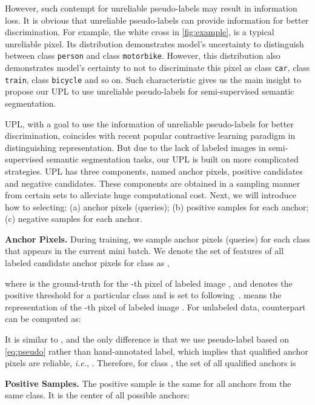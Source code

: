 \documentclass[10pt, twocolumn, letterpaper]{article}
\begin{document}
However, such contempt for unreliable pseudo-labels may result in information loss. 
It is obvious that unreliable pseudo-labels can provide information for better discrimination.
For example, the white cross in \cref{fig:example}, is a typical unreliable pixel. 
Its distribution demonstrates model's uncertainty to distinguish between class \texttt{person} and class \texttt{motorbike}.
However, this distribution also demonstrates model's certainty to not to discriminate this pixel as class \texttt{car}, class \texttt{train}, class \texttt{bicycle} and so on.
Such characteristic gives us the main insight to propose our UPL to use unreliable pseudo-labels for semi-supervised semantic segmentation.



UPL, with a goal to use the information of unreliable pseudo-labels for better discrimination, coincides with recent popular contrastive learning paradigm in distinguishing representation.
But due to the lack of labeled images in semi-supervised semantic segmentation tasks, our UPL is built on more complicated strategies.
UPL has three components, named anchor pixels, positive candidates and negative candidates. 
These components are obtained in a sampling manner from certain sets to alleviate huge computational cost.
Next, we will introduce how to selecting: (a) anchor pixels (queries); (b) positive samples for each anchor; (c) negative samples for each anchor. 



\noindent\textbf{Anchor Pixels.}
During training, we sample anchor pixels (queries) for each class that appears in the current mini batch.
We denote the set of features of all labeled candidate anchor pixels for class  as , 

where  is the ground-truth for the -th pixel of labeled image , and  denotes the positive threshold for a particular class and is set to  following~\cite{reco}. 
 means the representation of the -th pixel of labeled image .
For unlabeled data, counterpart  can be computed as:

It is similar to , and the only difference is that we use pseudo-label  based on \cref{eq:pseudo} rather than hand-annotated label, which implies that qualified anchor pixels are reliable, \textit{i.e.}, .
Therefore, for class , the set of all qualified anchors is



\noindent\textbf{Positive Samples.}
The positive sample is the same for all anchors from the same class.
It is the center of all possible anchors:
\end{document}
